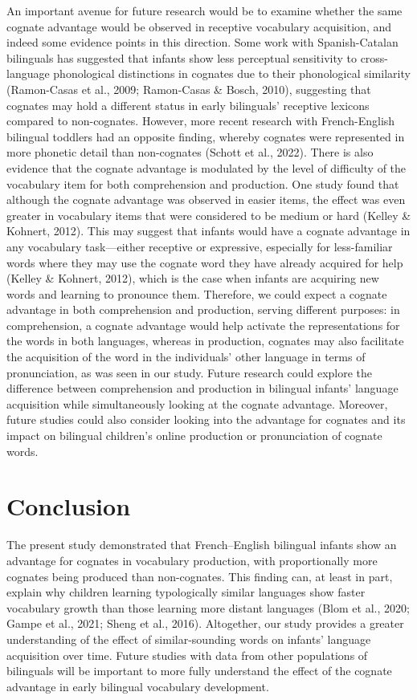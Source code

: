\documentclass[
  ,man,floatsintext]{apa6}
\begin{document}
An important avenue for future research would be to examine whether the same cognate advantage would be observed in receptive vocabulary acquisition, and indeed some evidence points in this direction. Some work with Spanish-Catalan bilinguals has suggested that infants show less perceptual sensitivity to cross-language phonological distinctions in cognates due to their phonological similarity (Ramon-Casas et al., 2009; Ramon-Casas \& Bosch, 2010), suggesting that cognates may hold a different status in early bilinguals' receptive lexicons compared to non-cognates. However, more recent research with French-English bilingual toddlers had an opposite finding, whereby cognates were represented in more phonetic detail than non-cognates (Schott et al., 2022). There is also evidence that the cognate advantage is modulated by the level of difficulty of the vocabulary item for both comprehension and production. One study found that although the cognate advantage was observed in easier items, the effect was even greater in vocabulary items that were considered to be medium or hard (Kelley \& Kohnert, 2012). This may suggest that infants would have a cognate advantage in any vocabulary task---either receptive or expressive, especially for less-familiar words where they may use the cognate word they have already acquired for help (Kelley \& Kohnert, 2012), which is the case when infants are acquiring new words and learning to pronounce them. Therefore, we could expect a cognate advantage in both comprehension and production, serving different purposes: in comprehension, a cognate advantage would help activate the representations for the words in both languages, whereas in production, cognates may also facilitate the acquisition of the word in the individuals' other language in terms of pronunciation, as was seen in our study. Future research could explore the difference between comprehension and production in bilingual infants' language acquisition while simultaneously looking at the cognate advantage. Moreover, future studies could also consider looking into the advantage for cognates and its impact on bilingual children's online production or pronunciation of cognate words.

\hypertarget{conclusion}{%
\section{Conclusion}\label{conclusion}}

The present study demonstrated that French--English bilingual infants show an advantage for cognates in vocabulary production, with proportionally more cognates being produced than non-cognates. This finding can, at least in part, explain why children learning typologically similar languages show faster vocabulary growth than those learning more distant languages (Blom et al., 2020; Gampe et al., 2021; Sheng et al., 2016). Altogether, our study provides a greater understanding of the effect of similar-sounding words on infants' language acquisition over time. Future studies with data from other populations of bilinguals will be important to more fully understand the effect of the cognate advantage in early bilingual vocabulary development.
\end{document}
